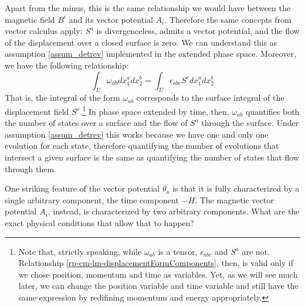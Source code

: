 Apart from the minus, this is the same relationship we would have between the magnetic field $B^i$ and its vector potential $A_i$. Therefore the same concepts from vector calculus apply: $S^a$ is divergenceless, admits a vector potential, and the flow of the displacement over a closed surface is zero. We can understand this as assumption \ref{assum_detrev} implemented in the extended phase space. Moreover, we have the following relationship:
\begin{equation}
	\int_{\Sigma} \omega_{ab} dx_1^a dx_2^b = \int_{\Sigma} \epsilon_{abc}S^c dx_1^a dx_2^b
\end{equation}
That is, the integral of the form $\omega_{ab}$ corresponds to the surface integral of the displacement field $S^a$.\footnote{Note that, strictly speaking, while $\omega_{ab}$ is a tensor, $\epsilon_{abc}$ and $S^a$ are not. Relationship \ref{rp-cm-lm-displacementFormComponents}, then, is valid only if we chose position, momentum and time as variables. Yet, as we will see much later, we can change the position variable and time variable and still have the same expression by redifining momentum and energy appropriately.} In phase space extended by time, then, $\omega_{ab}$ quantifies both the number of states over a surface and the flow of $S^a$ through the surface. Under assumption \ref{assum_detrev} this works because we have one and only one evolution for each state, therefore quantifying the number of evolutions that intersect a given surface is the same as quantifying the number of states that flow through them.

One striking feature of the vector potential $\theta_a$ is that it is fully characterized by a single arbitrary component, the time component $-H$. The magnetic vector potential $A_i$, instead, is characterized by two arbitrary components. What are the exact physical conditions that allow that to happen?

